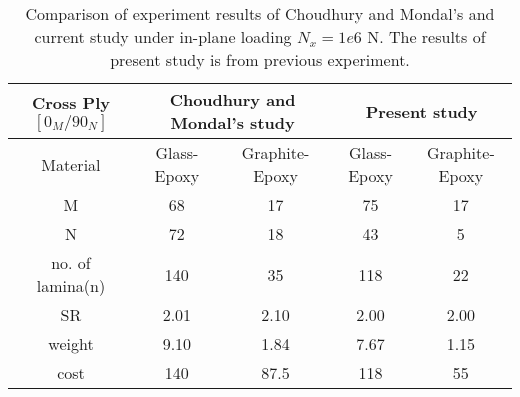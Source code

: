 \begin{table*}[!htb]
\caption{Comparison of experiment results of Choudhury and
Mondal's\cite{choudhury2019failure} and current study under in-plane loading
$N_x=1e6$ N. The results of present study is from previous experiment.}
\centering
\begin{adjustbox}{width=1\textwidth}
	\begin{tabular}{c|cc|cc}
		\toprule
		Cross Ply $[0_M/90_N]$         & \multicolumn{2}{c}{Choudhury and Mondal's study} & \multicolumn{2}{c}{Present study} \\
		\midrule																								  
		 Material       &  Glass-Epoxy & Graphite-Epoxy  & Glass-Epoxy & Graphite-Epoxy      \\ 
			  M         &  68          &    17           &  75		    &  17             \\
			  N         &  72          &    18           &  43		    &  5              \\
	no. of lamina(n)    &  140         &    35           &  118	        &  22                     \\
			 SR         &  2.01        &    2.10         &  2.00	    &  2.00            \\
		 weight         &  9.10        &    1.84         &  7.67	    &  1.15           \\
		 cost           &  140         &    87.5         &  118	        &  55           \\
		\bottomrule
	\end{tabular}
\end{adjustbox}
\label{tab:comparsion}
\end{table*}
